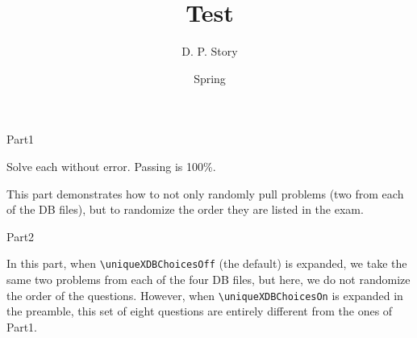 \documentclass[a4paper]{article}
\title[T\nExam]{Test \nExam}
\author{D. P. Story}
\date{Spring \the\year}
\begin{document}
\maketitle

\begin{exam}{Part1}

\begin{instructions}
Solve each without error. Passing is 100\%.

\medskip\noindent
This part demonstrates how to not only randomly pull problems (two from each of the DB files), but
to randomize the order they are listed in the exam.
\end{instructions}

\ranToksOff

{%
  {}
  {}
  {}
  {}
  {}
  {}
  {}
  {}
}

\end{exam}

\newpage


\begin{exam}{Part2}

\begin{instructions}
In this part, when \verb~\uniqueXDBChoicesOff~ (the default) is
expanded, we take the same two problems from each of the four DB
files, but here, we do not randomize the order of the questions. However,
when \verb~\uniqueXDBChoicesOn~ is expanded in the preamble,
this set of eight questions are entirely different from the ones
of \textsf{Part1}.
\end{instructions}


\end{exam}
\end{document}

